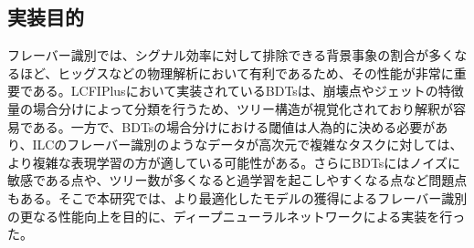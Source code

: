 \subsection{実装目的}
フレーバー識別では、シグナル効率に対して排除できる背景事象の割合が多くなるほど、ヒッグスなどの物理解析において有利であるため、その性能が非常に重要である。LCFIPlusにおいて実装されているBDTsは、崩壊点やジェットの特徴量の場合分けによって分類を行うため、ツリー構造が視覚化されており解釈が容易である。一方で、BDTsの場合分けにおける閾値は人為的に決める必要があり、ILCのフレーバー識別のようなデータが高次元で複雑なタスクに対しては、より複雑な表現学習の方が適している可能性がある。さらにBDTsにはノイズに敏感である点や、ツリー数が多くなると過学習を起こしやすくなる点など問題点もある。そこで本研究では、より最適化したモデルの獲得によるフレーバー識別の更なる性能向上を目的に、ディープニューラルネットワークによる実装を行った。
